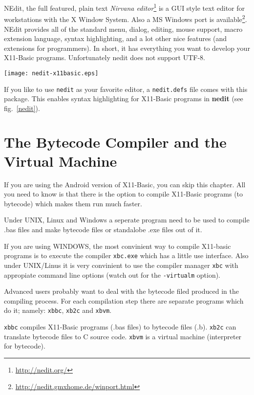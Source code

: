 NEdit, the full featured, plain text {\it Nirvana 
editor}\footnote{\url{http://nedit.org/}} is a GUI style text editor for
workstations with the X Window System.  Also a MS Windows port is
available\footnote{ \url{http://nedit.gmxhome.de/winport.html}}. NEdit provides
all of the standard menu, dialog, editing, mouse support, macro extension
language, syntax highlighting, and a lot other nice features (and extensions for
programmers). In short, it has everything you want to develop your X11-Basic
programs. Unfortunately nedit does not support UTF-8.

\begin{SCfigure}
\texttt{[image: nedit-x11basic.eps]}
\caption{The Nirvana Editor with syntax highlighting for a X11-Basic program.}
\label{nedit}
\end{SCfigure}

If you like to use \verb|nedit| as your favorite editor, a \verb|nedit.defs| file
comes  with this package. This enables syntax highlighting for X11-Basic
programs in {\bf nedit} (see fig.~\ref{nedit}).

\section{The Bytecode Compiler and the Virtual Machine}

If you are using the Android version of X11-Basic, you can skip this chapter.
All you need to know is that there is the option to compile X11-Basic programs
(to bytecode) which makes them run much faster.

Under UNIX, Linux and Windows a seperate program need to be used to compile .bas files and make bytecode files or 
standalobe .exe files out of it. 

If you are using WINDOWS, the most convinient way to compile  X11-basic programs
is to execute the compiler \verb|xbc.exe| which has a little use interface. Also
under UNIX/Linus it is very convinient to use the compiler manager \verb|xbc|
with appropiate command line options (watch out for the 
\verb|-virtualm| option). 

Advanced users probably want to deal with the bytecode filed produced in the
compiling process. For each compilation step there are separate programs which
do it; namely: \verb|xbbc|, \verb|xb2c| and \verb|xbvm|.

\verb|xbbc| compiles X11-Basic programs (.bas files) to bytecode files (.b).
\verb|xb2c| can translate bytecode files to C source code.
\verb|xbvm| is a virtual machine (interpreter for bytecode).

